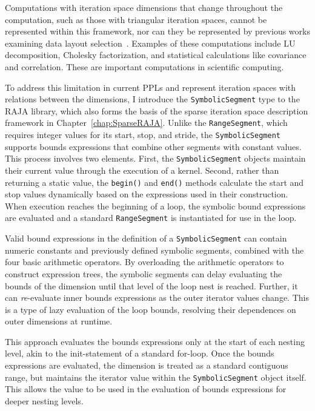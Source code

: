 Computations with iteration space dimensions that change throughout the computation, such as those with triangular iteration spaces, cannot be represented within this framework, nor can they be represented by previous works examining data layout selection~\cite{kennedy1998automatic}. 
Examples of these computations include LU decomposition, Cholesky factorization, and statistical calculations like covariance and correlation.
These are important computations in scientific computing.

To address this limitation in current PPLs and represent iteration spaces with relations between the dimensions, I introduce the \verb.SymbolicSegment. type to the RAJA library, which also forms the basis of the sparse iteration space description framework in Chapter~\ref{chap:SparseRAJA}. 
Unlike the \verb.RangeSegment., which requires integer values for its start, stop, and stride, the \verb.SymbolicSegment. supports bounds expressions that combine other segments with constant values. 
This process involves two elements.
First, the \verb.SymbolicSegment. objects maintain their current value through the execution of a kernel. 
Second, rather than returning a static value, the \verb.begin(). and \verb.end(). methods calculate the start and stop values dynamically based on the expressions used in their construction. 
When execution reaches the beginning of a loop, the symbolic bound expressions are evaluated and a standard \verb.RangeSegment. is instantiated for use in the loop.

Valid bound expressions in the definition of a \verb.SymbolicSegment. can contain numeric constants and previously defined symbolic segments, combined with the four basic arithmetic operators. 
By overloading the arithmetic operators to construct expression trees, the symbolic segments can delay evaluating the bounds of the dimension until that level of the loop nest is reached.
Further, it can \textit{re}-evaluate inner bounds expressions as the outer iterator values change.
This is a type of lazy evaluation of the loop bounds, resolving their dependences on outer dimensions at runtime.

This approach evaluates the bounds expressions only at the start of each nesting level, akin to the init-statement of a standard for-loop.
Once the bounds expressions are evaluated, the dimension is treated as a standard contiguous range, but maintains the iterator value within the \verb.SymbolicSegment. object itself.
This allows the value to be used in the evaluation of bounds expressions for deeper nesting levels.

